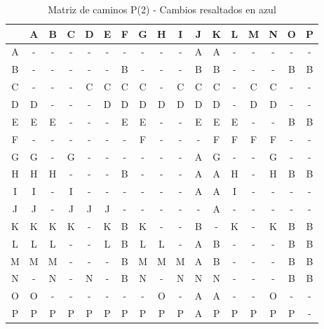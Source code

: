 \documentclass[12pt]{article}
\begin{document}
\begin{table}[h!]
\centering
\begin{tabular}{|c|c|c|c|c|c|c|c|c|c|c|c|c|c|c|c|c|}
\hline
 & A & B & C & D & E & F & G & H & I & J & K & L & M & N & O & P \\\hline
A & - & - & - & - & - & - & - & - & - & A & A & - & - & - & - & - \\\hline
B & - & - & - & - & - & B & - & - & - & B & B & - & - & - & B & B \\\hline
C & - & - & - & C & C & C & C & - & C & C & C & - & C & C & - & - \\\hline
D & D & - & - & - & D & D & D & D & D & D & D & - & D & D & - & - \\\hline
E & E & E & - & - & - & E & E & - & - & E & E & E & - & - & \cellcolor{lightblue} B & \cellcolor{lightblue} B \\\hline
F & - & - & - & - & - & - & F & - & - & - & F & F & F & F & - & - \\\hline
G & G & - & G & - & - & - & - & - & - & A & G & - & - & G & - & - \\\hline
H & H & H & - & - & - & \cellcolor{lightblue} B & - & - & - & A & A & H & - & H & \cellcolor{lightblue} B & \cellcolor{lightblue} B \\\hline
I & I & - & I & - & - & - & - & - & - & A & A & I & - & - & - & - \\\hline
J & J & - & J & J & J & - & - & - & - & - & A & - & - & - & - & - \\\hline
K & K & K & K & - & K & \cellcolor{lightblue} B & K & - & - & \cellcolor{lightblue} B & - & K & - & K & \cellcolor{lightblue} B & \cellcolor{lightblue} B \\\hline
L & L & L & - & - & L & \cellcolor{lightblue} B & L & L & - & A & \cellcolor{lightblue} B & - & - & - & \cellcolor{lightblue} B & \cellcolor{lightblue} B \\\hline
M & M & M & - & - & - & \cellcolor{lightblue} B & M & M & M & A & \cellcolor{lightblue} B & - & - & - & \cellcolor{lightblue} B & \cellcolor{lightblue} B \\\hline
N & - & N & - & N & - & \cellcolor{lightblue} B & N & - & N & N & N & - & - & - & \cellcolor{lightblue} B & \cellcolor{lightblue} B \\\hline
O & O & - & - & - & - & - & - & O & - & A & A & - & - & O & - & - \\\hline
P & P & P & P & P & P & P & P & P & P & A & P & P & P & P & P & - \\\hline
\end{tabular}
\caption{Matriz de caminos P(2) - Cambios resaltados en azul}
\end{table}
\end{document}
